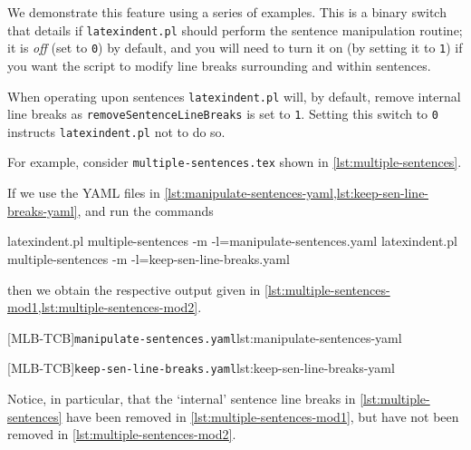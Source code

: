  We demonstrate this feature using a series of examples.
 This is a binary switch that details if \texttt{latexindent.pl} should perform the
 sentence manipulation routine; it is \emph{off} (set to \texttt{0}) by default, and you
 will need to turn it on (by setting it to \texttt{1}) if you want the script to modify
 line breaks surrounding and within sentences.

 When operating upon sentences \texttt{latexindent.pl} will, by default, remove internal
 line breaks as \texttt{removeSentenceLineBreaks} is set to \texttt{1}. Setting this
 switch to \texttt{0} instructs \texttt{latexindent.pl} not to do so.

 \begin{example}
 For example, consider \texttt{multiple-sentences.tex} shown in
 \cref{lst:multiple-sentences}.


 If we use the YAML files in
 \cref{lst:manipulate-sentences-yaml,lst:keep-sen-line-breaks-yaml}, and run the commands
  
 \begin{widepage}

  \begin{commandshell}
latexindent.pl multiple-sentences -m -l=manipulate-sentences.yaml
latexindent.pl multiple-sentences -m -l=keep-sen-line-breaks.yaml
\end{commandshell}

 \end{widepage}
 then we obtain the respective output given in
 \cref{lst:multiple-sentences-mod1,lst:multiple-sentences-mod2}.

 \begin{cmhtcbraster}
  [MLB-TCB]{\texttt{manipulate-sentences.yaml}}{lst:manipulate-sentences-yaml}
 \end{cmhtcbraster}

 \begin{cmhtcbraster}
  [MLB-TCB]{\texttt{keep-sen-line-breaks.yaml}}{lst:keep-sen-line-breaks-yaml}
 \end{cmhtcbraster}

 Notice, in particular, that the `internal' sentence line breaks in
 \cref{lst:multiple-sentences} have been removed in \cref{lst:multiple-sentences-mod1},
 but have not been removed in \cref{lst:multiple-sentences-mod2}.
 \end{example}

